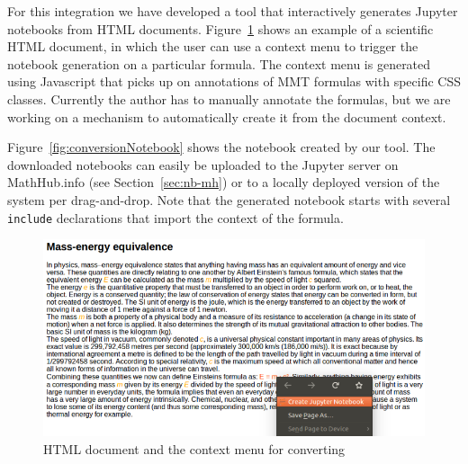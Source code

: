For this integration we have developed a tool that interactively generates Jupyter notebooks from HTML documents.
Figure~\ref{fig:conversionHTML} shows an example of a scientific HTML document, in which the user can use a context menu to trigger the notebook generation on a particular formula.
The context menu is generated using Javascript that picks up on annotations of MMT formulas with specific CSS classes.
Currently the author has to manually annotate the formulas, but we are working on a mechanism to automatically create it from the document context.

Figure~\ref{fig:conversionNotebook} shows the notebook created by our tool.
The downloaded notebooks can easily be uploaded to the Jupyter server on MathHub.info (see Section~\ref{sec:nb-mh}) or to a locally deployed version of the system per drag-and-drop.
Note that the generated notebook starts with several \texttt{include} declarations that import the context of the formula.


\begin{figure}[ht]\centering
\includegraphics[width=12cm]{conversionHTML}
\caption{HTML document and the context menu for converting}
\label{fig:conversionHTML}
\end{figure}


